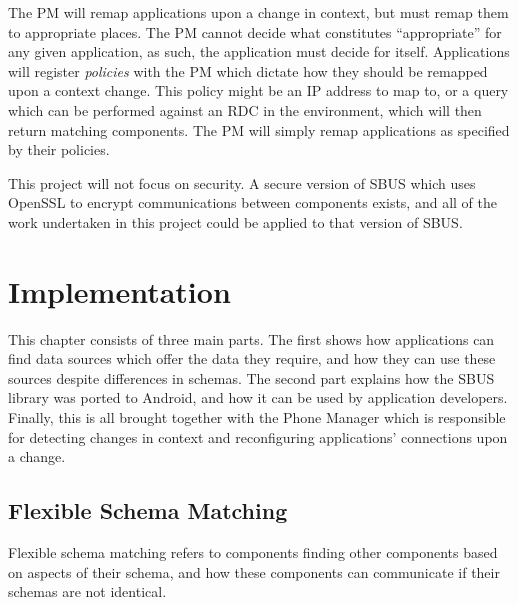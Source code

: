 \documentclass[12pt,twoside,notitlepage]{report}
\begin{document}
The PM will remap applications upon a change in context, but must remap them to appropriate places. 
The PM cannot decide what constitutes ``appropriate'' for any given application, as such, the application must decide for itself. 
Applications will register {\sl policies} with the PM which dictate how they should be remapped upon a context change. 
This policy might be an IP address to map to, or a query which can be performed against an RDC in the environment, which will then return matching components. 
The PM will simply remap applications as specified by their policies.

This project will not focus on security. 
A secure version of SBUS which uses OpenSSL to encrypt communications between components exists, and all of the work undertaken in this project could be applied to that version of SBUS.

\cleardoublepage


\chapter{Implementation}

This chapter consists of three main parts. 
The first shows how applications can find data sources which offer the data they require, and how they can use these sources despite differences in schemas. 
The second part explains how the SBUS library was ported to Android, and how it can be used by application developers. 
Finally, this is all brought together with the Phone Manager which is responsible for detecting changes in context and reconfiguring applications' connections upon a change.

\section{Flexible Schema Matching}

Flexible schema matching refers to components finding other components based on aspects of their schema, and how these components can communicate if their schemas are not identical. 
\end{document}
